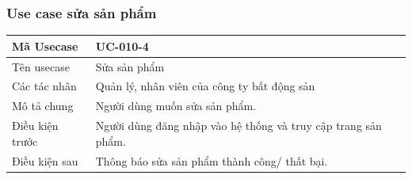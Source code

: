 \documentclass[12pt,a4paper]{article}
\begin{document}
    \subsubsection*{Use case sửa sản phẩm }
    \begin{table}[H]
        \centering
        \begin{tabular}{|p{3.5cm}|p{11.5cm}|c|}
            \hline
            Mã Usecase      & UC-010-4                                                      \\
            \hline
            Tên usecase     & Sửa sản phẩm                                                  \\
            \hline
            Các tác nhân    & Quản lý, nhân viên của công ty bất động sản                   \\
            \hline
            Mô tả chung     & Người dùng muốn sửa sản phẩm.                                 \\
            \hline

            Điều kiện trước & Người dùng đăng nhập vào hệ thống và truy cập trang sản phẩm. \\
            \hline

            Điều kiện sau   & Thông báo sửa sản phẩm thành công/ thất bại.                  \\
            \hline


\end{tabular}
\end{table}
\end{document}

